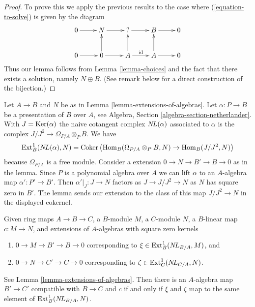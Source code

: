 \begin{proof}
To prove this we apply the previous results to the case where
(\ref{equation-to-solve}) is given by the diagram
$$
\xymatrix{
0 \ar[r] & N \ar[r] & {?} \ar[r] & B \ar[r] & 0 \\
0 \ar[r] & 0 \ar[u] \ar[r] & A \ar[u] \ar[r]^{\text{id}} & A \ar[u] \ar[r] & 0
}
$$
Thus our lemma follows from Lemma \ref{lemma-choices}
and the fact that there exists a solution, namely $N \oplus B$.
(See remark below for a direct construction of the bijection.)
\end{proof}

\begin{remark}
\label{remark-extensions-of-algebras}
Let $A \to B$ and $N$ be as in Lemma \ref{lemma-extensions-of-algebras}.
Let $\alpha : P \to B$ be a presentation of $B$ over $A$, see
Algebra, Section \ref{algebra-section-netherlander}.
With $J = \mathop{\mathrm{Ker}}(\alpha)$ the naive cotangent complex $\mathop{N\!L}\nolimits(\alpha)$
associated to $\alpha$ is the complex $J/J^2 \to \Omega_{P/A} \otimes_P B$.
We have
$$
\mathop{\mathrm{Ext}}\nolimits^1_B(\mathop{N\!L}\nolimits(\alpha), N) =
\mathop{\mathrm{Coker}}\left(\mathop{\mathrm{Hom}}\nolimits_B(\Omega_{P/A} \otimes_P B, N) \to \mathop{\mathrm{Hom}}\nolimits_B(J/J^2, N)\right)
$$
because $\Omega_{P/A}$ is a free module.
Consider a extension $0 \to N \to B' \to B \to 0$ as in the lemma.
Since $P$ is a polynomial algebra over $A$ we can
lift $\alpha$ to an $A$-algebra map $\alpha' : P' \to B'$.
Then $\alpha'|_J : J \to N$ factors as $J \to J/J^2 \to N$
as $N$ has square zero in $B'$. The lemma sends our extension
to the class of this map $J/J^2 \to N$ in the displayed cokernel.
\end{remark}

\begin{lemma}
\label{lemma-extensions-of-algebras-functorial}
Given ring maps $A \to B \to C$, a $B$-module $M$, a $C$-module $N$,
a $B$-linear map $c : M \to N$, and extensions of
$A$-algebras with square zero kernels
\begin{enumerate}
\item[(a)] $0 \to M \to B' \to B \to 0$ corresponding to
$\xi \in \mathop{\mathrm{Ext}}\nolimits^1_B(\mathop{N\!L}\nolimits_{B/A}, M)$, and
\item[(b)] $0 \to N \to C' \to C \to 0$ corresponding to
$\zeta \in \mathop{\mathrm{Ext}}\nolimits^1_C(\mathop{N\!L}\nolimits_{C/A}, N)$.
\end{enumerate}
See Lemma \ref{lemma-extensions-of-algebras}.
Then there is an $A$-algebra map $B' \to C'$ compatible with
$B \to C$ and $c$ if and only if $\xi$ and $\zeta$
map to the same element of
$\mathop{\mathrm{Ext}}\nolimits^1_B(\mathop{N\!L}\nolimits_{B/A}, N)$.
\end{lemma}

